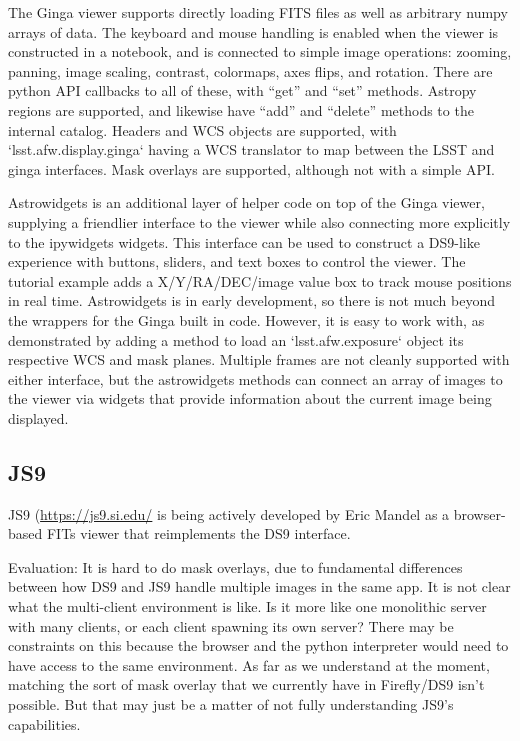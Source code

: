 The Ginga viewer supports directly loading FITS files as well as arbitrary numpy arrays of data.  The keyboard and mouse handling is enabled when the viewer is constructed in a notebook, and is connected to simple image operations: zooming, panning, image scaling, contrast, colormaps, axes flips, and rotation.  There are python API callbacks to all of these, with ``get'' and ``set'' methods.  Astropy regions are supported, and likewise have ``add'' and ``delete'' methods to the internal catalog.  Headers and WCS objects are supported, with `lsst.afw.display.ginga` having a WCS translator to map between the LSST and ginga interfaces.  Mask overlays are supported, although not with a simple API.

Astrowidgets is an additional layer of helper code on top of the Ginga viewer, supplying a friendlier interface to the viewer while also connecting more explicitly to the ipywidgets widgets.  This interface can be used to construct a DS9-like experience with buttons, sliders, and text boxes to control the viewer.  The tutorial example adds a X/Y/RA/DEC/image value box to track mouse positions in real time.  Astrowidgets is in early development, so there is not much beyond the wrappers for the Ginga built in code.  However, it is easy to work with, as demonstrated by adding a method to load an `lsst.afw.exposure` object its respective WCS and mask planes.  Multiple frames are not cleanly supported with either interface, but the astrowidgets methods can connect an array of images to the viewer via widgets that provide information about the current image being displayed.

\subsection{JS9}

JS9 (\url{https://js9.si.edu/} is being actively developed by Eric Mandel as a browser-based FITs viewer that reimplements the DS9 interface.

Evaluation:
It is hard to do mask overlays, due to fundamental differences between how DS9 and JS9 handle multiple images in the same app.
It is not clear what the multi-client environment is like. Is it more like  one monolithic server with many clients, or each client spawning its own server?
There may be constraints on this because the browser and the python interpreter would need to have access to the same environment.
As far as we understand at the moment, matching the sort of mask overlay that we currently have in Firefly/DS9 isn't possible.
But that may just be a matter of not fully understanding JS9's capabilities.

